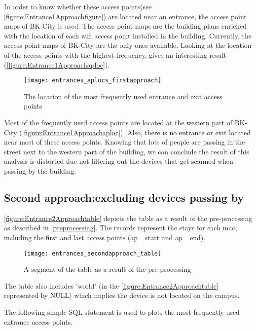 In order to know whether these access points(see \autoref{figure:Entrance1Approachfigure}) are located near an entrance, the access point maps of BK-City is used. The access point maps are the building plans enriched with the location of each wifi access point installed in the building. Currently, the access point maps of BK-City are the only ones available. Looking at the location of the access points with the highest frequency, gives an interesting result (\autoref{figure:Entrance1Approachaploc}).
 
\begin{figure}[H]
\centering
\texttt{[image: entrances\_aplocs\_firstapproach]}
\captionsetup{justification=centering}
\caption{The location of the most frequently used entrance and exit access points}
\label{figure:Entrance1Approachaploc}
\end{figure}
Most of the frequently used access points are located at the western part of BK-City (\autoref{figure:Entrance1Approachaploc}). Also, there is no entrance or exit located near most of these access points. Knowing that lots of people are passing in the street next to the western part of the building, we can conclude the result of this analysis is distorted due not filtering out the devices that get scanned when passing by the building.

\subsection{Second approach:excluding devices passing by}\label{secondapproach}

\autoref{figure:Entrance2Approachtable} depicts the table as a result of the pre-processing as described in \autoref{preprocessing}. The records represent the stays for each mac, including the first and last access points (ap\_ start and ap\_ end).

\begin{figure}[H]
\centering
\texttt{[image: entrances\_secondapproach\_table]}
\captionsetup{justification=centering}
\caption{A segment of the table as a result of the pre-processing}
\label{figure:Entrance2Approachtable}
\end{figure}

The table also includes 'world' (in the \autoref{figure:Entrance2Approachtable} represented by NULL) which implies the device is not located on the campus. 

The following simple SQL statement is used to plots the most frequently used entrance access points.

